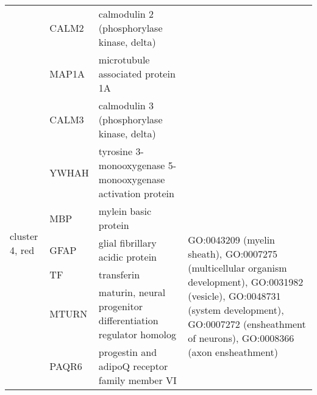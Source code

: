 \begin{table}[htp]
\begin{center}
\begin{tabular}{|p{0.7in}|p{0.7in}|p{2in}|p{3in}|}
			& \small{CALM2} & \footnotesize{calmodulin 2 (phosphorylase kinase, delta)} & \\
			& \small{MAP1A} & \footnotesize{microtubule associated protein 1A} &\\
			&  \small{CALM3} & \footnotesize{calmodulin 3 (phosphorylase kinase, delta)} & \\
			& \small{YWHAH} & \footnotesize{tyrosine 3-monooxygenase  5-monooxygenase activation protein} & \\
\hline
 \multirow{3}{4em}{\small{cluster 4, red}} & \small{MBP} & \footnotesize{mylein basic protein} & \multirow{6}{16em}{\footnotesize{GO:0043209 (myelin sheath), GO:0007275 (multicellular organism development), GO:0031982 (vesicle), GO:0048731 (system development), GO:0007272 (ensheathment of neurons), GO:0008366 (axon ensheathment)}} \\
 			& \small{GFAP} & \footnotesize{glial fibrillary acidic protein} & \\
			& \small{TF} & \footnotesize{transferin} & \\
			& \small{MTURN} & \footnotesize{maturin, neural progenitor differentiation regulator homolog } & \\
			& \small{PAQR6} & \footnotesize{progestin and adipoQ receptor family member VI} & \\
\hline	
\end{tabular}
\end{center}
 \end{table}

